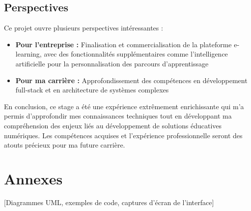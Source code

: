 \documentclass[12pt, a4paper]{report}
\begin{document}
\section{Perspectives}

Ce projet ouvre plusieurs perspectives intéressantes :
\begin{itemize}
  \item \textbf{Pour l'entreprise :} Finalisation et commercialisation de la plateforme e-learning, avec des fonctionnalités supplémentaires comme l'intelligence artificielle pour la personnalisation des parcours d'apprentissage
  \item \textbf{Pour ma carrière :} Approfondissement des compétences en développement full-stack et en architecture de systèmes complexes
\end{itemize}

En conclusion, ce stage a été une expérience extrêmement enrichissante qui m'a permis d'approfondir mes connaissances techniques tout en développant ma compréhension des enjeux liés au développement de solutions éducatives numériques. Les compétences acquises et l'expérience professionnelle seront des atouts précieux pour ma future carrière.

\appendix
\chapter{Annexes}
\thispagestyle{fancy}
[Diagrammes UML, exemples de code, captures d'écran de l'interface]
\end{document}
